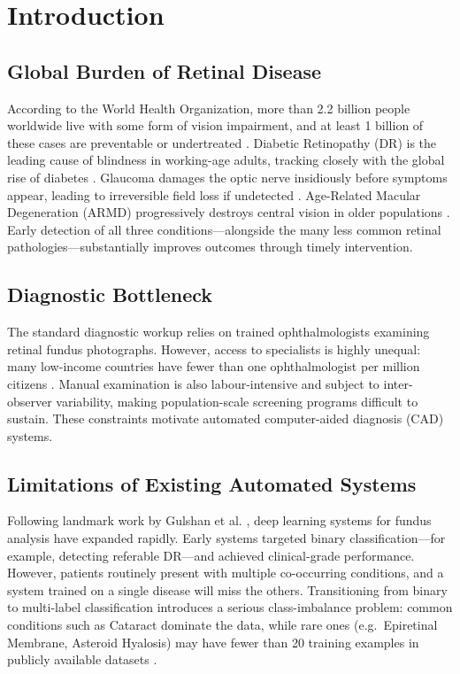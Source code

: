 \documentclass[conference]{IEEEtran}
\begin{document}
\section{Introduction}

\subsection{Global Burden of Retinal Disease}
According to the World Health Organization, more than 2.2 billion people worldwide live with some form of vision impairment, and at least 1 billion of these cases are preventable or undertreated \cite{who_vision}. Diabetic Retinopathy (DR) is the leading cause of blindness in working-age adults, tracking closely with the global rise of diabetes \cite{yau2012global}. Glaucoma damages the optic nerve insidiously before symptoms appear, leading to irreversible field loss if undetected \cite{tham2014global}. Age-Related Macular Degeneration (ARMD) progressively destroys central vision in older populations \cite{wong2014global}. Early detection of all three conditions—alongside the many less common retinal pathologies—substantially improves outcomes through timely intervention.

\subsection{Diagnostic Bottleneck}
The standard diagnostic workup relies on trained ophthalmologists examining retinal fundus photographs. However, access to specialists is highly unequal: many low-income countries have fewer than one ophthalmologist per million citizens \cite{resnikoff2012number}. Manual examination is also labour-intensive and subject to inter-observer variability, making population-scale screening programs difficult to sustain. These constraints motivate automated computer-aided diagnosis (CAD) systems.

\subsection{Limitations of Existing Automated Systems}
Following landmark work by Gulshan et al. \cite{gulshan2016development}, deep learning systems for fundus analysis have expanded rapidly. Early systems targeted binary classification—for example, detecting referable DR—and achieved clinical-grade performance. However, patients routinely present with multiple co-occurring conditions, and a system trained on a single disease will miss the others. Transitioning from binary to multi-label classification introduces a serious class-imbalance problem: common conditions such as Cataract dominate the data, while rare ones (e.g.\ Epiretinal Membrane, Asteroid Hyalosis) may have fewer than 20 training examples in publicly available datasets \cite{buda2018systematic}.
\end{document}
